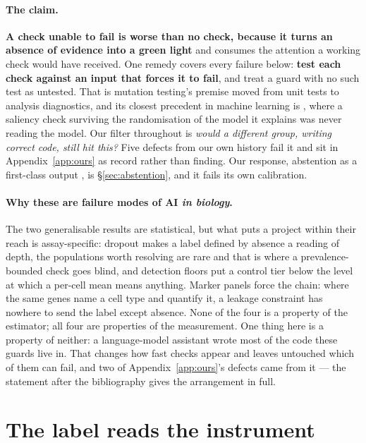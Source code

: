 \documentclass{article}
\begin{document}
\paragraph{The claim.} \textbf{A check unable to fail is worse than no check,
because it turns an absence of evidence into a green light} and consumes the
attention a working check would have received. One remedy covers every failure
below: \textbf{test each check against an input that forces it to fail}, and
treat a guard with no such test as untested. That is mutation testing's premise
\citep{demillo1978,jia2011} moved from unit tests to analysis diagnostics, and
its closest precedent in machine learning is \citet{adebayo2018}, where a
saliency check surviving the randomisation of the model it explains was never
reading the model. Our filter throughout is
\emph{would a different group, writing correct code, still hit this?} Five
defects from our own history fail it and sit in Appendix~\ref{app:ours} as record
rather than finding. Our response, abstention as a first-class output
\citep{chow1970}, is \S\ref{sec:abstention}, and it fails its own calibration.

\paragraph{Why these are failure modes of AI \emph{in biology}.} The two
generalisable results are statistical, but what puts a project within their reach
is assay-specific: dropout makes a label defined by absence a reading of depth,
the populations worth resolving are rare and that is where a prevalence-bounded
check goes blind, and detection floors put a control tier below the level at
which a per-cell mean means anything. Marker panels force the chain: where the
same genes name a cell type and quantify it, a leakage constraint has nowhere to
send the label except absence. None of the four is a property of the estimator;
all four are properties of the measurement. One thing here is a property of
neither: a language-model assistant wrote most of the code these guards live in.
That changes how fast checks appear and leaves untouched which of them can fail,
and two of Appendix~\ref{app:ours}'s defects came from it --- the statement after
the bibliography gives the arrangement in full.

\section{The label reads the instrument}
\label{sec:depth}
\end{document}
